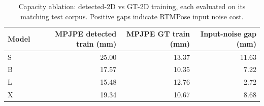 \begin{table}[t]
\centering
\caption{Capacity ablation: detected-2D vs GT-2D training, each evaluated on its matching test corpus. Positive gaps indicate RTMPose input noise cost.}
\begin{tabular}{lrrr}
\toprule
Model & MPJPE detected train (mm) & MPJPE GT train (mm) & Input-noise gap (mm) \\
\midrule
S & 25.00 & 13.37 & 11.63 \\
B & 17.57 & 10.35 & 7.22 \\
L & 15.48 & 12.76 & 2.72 \\
X & 19.34 & 10.67 & 8.68 \\
\bottomrule
\end{tabular}
\end{table}